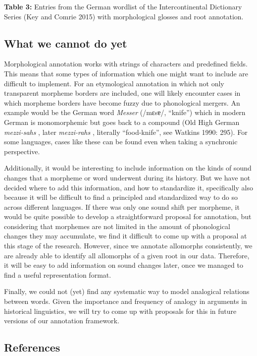 \documentclass[
  english,
  a4paper,
  oneside,tablecaptionabove
]{scrbook}
\begin{document}
\textbf{Table 3:} Entries from the German wordlist of the
Intercontinental Dictionary Series (Key and Comrie 2015) with
morphological glosses and root annotation.

\hypertarget{what-we-cannot-do-yet}{%
\subsection{What we cannot do yet}\label{what-we-cannot-do-yet}}

Morphological annotation works with strings of characters and predefined
fields. This means that some types of information which one might want
to include are difficult to implement. For an etymological annotation in
which not only transparent morpheme borders are included, one will
likely encounter cases in which morpheme borders have become fuzzy due
to phonological mergers. An example would be the German word
\emph{Messer} (/mɛsɐ/, \enquote{knife}) which in modern German is
monomorphemic but goes back to a compound (Old High German
\emph{mezzi-sahs} , later \emph{mezzi-rahs} , literally
\enquote{food-knife}, see Watkins 1990: 295). For some languages, cases
like these can be found even when taking a synchronic perspective.

Additionally, it would be interesting to include information on the
kinds of sound changes that a morpheme or word underwent during its
history. But we have not decided where to add this information, and how
to standardize it, specifically also because it will be difficult to
find a principled and standardized way to do so across different
languages. If there was only one sound shift per morpheme, it would be
quite possible to develop a straightforward proposal for annotation, but
considering that morphemes are not limited in the amount of phonological
changes they may accumulate, we find it difficult to come up with a
proposal at this stage of the research. However, since we annotate
allomorphs consistently, we are already able to identify all allomorphs
of a given root in our data. Therefore, it will be easy to add
information on sound changes later, once we managed to find a useful
representation format.

Finally, we could not (yet) find any systematic way to model analogical
relations between words. Given the importance and frequency of analogy
in arguments in historical linguistics, we will try to come up with
proposals for this in future versions of our annotation framework.

\hypertarget{references-2}{%
\subsection*{References}\label{references-2}}
\end{document}
